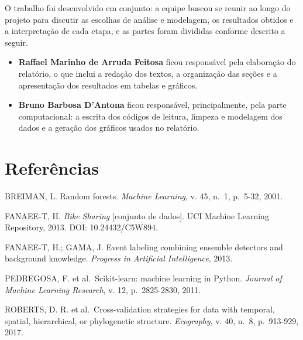 \documentclass[
  portuguese,
  10pt,
  a4paper,
]{article}
\providecommand{\tightlist}{%
  \setlength{\itemsep}{0pt}\setlength{\parskip}{0pt}}
\begin{document}
O trabalho foi desenvolvido em conjunto: a equipe buscou se reunir ao
longo do projeto para discutir as escolhas de análise e modelagem, os
resultados obtidos e a interpretação de cada etapa, e as partes foram
divididas conforme descrito a seguir.

\begin{itemize}
\tightlist
\item
  \textbf{Raffael Marinho de Arruda Feitosa} ficou responsável pela
  elaboração do relatório, o que inclui a redação dos textos, a
  organização das seções e a apresentação dos resultados em tabelas e
  gráficos.
\item
  \textbf{Bruno Barbosa D'Antona} ficou responsável, principalmente,
  pela parte computacional: a escrita dos códigos de leitura, limpeza e
  modelagem dos dados e a geração dos gráficos usados no relatório.
\end{itemize}

\section*{Referências}\label{referuxeancias}

BREIMAN, L. Random forests. \emph{Machine Learning}, v. 45, n.~1,
p.~5-32, 2001.

FANAEE-T, H. \emph{Bike Sharing} {[}conjunto de dados{]}. UCI Machine
Learning Repository, 2013. DOI: 10.24432/C5W894.

FANAEE-T, H.; GAMA, J. Event labeling combining ensemble detectors and
background knowledge. \emph{Progress in Artificial Intelligence}, 2013.

PEDREGOSA, F. et al.~Scikit-learn: machine learning in Python.
\emph{Journal of Machine Learning Research}, v. 12, p.~2825-2830, 2011.

ROBERTS, D. R. et al.~Cross-validation strategies for data with
temporal, spatial, hierarchical, or phylogenetic structure.
\emph{Ecography}, v. 40, n.~8, p.~913-929, 2017.
\end{document}
